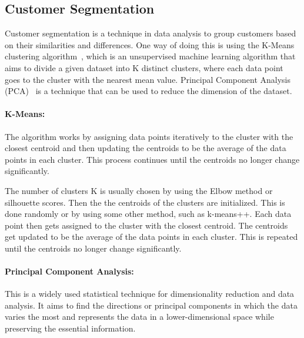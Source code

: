 \documentclass[a4paper,fleqn]{cas-sc}
\begin{document}
\subsection{Customer Segmentation}

Customer segmentation is a technique in data analysis to group customers based on their similarities and differences. One way of doing this is using the K-Means clustering algorithm~\cite{kmeans}, which is an unsupervised machine learning algorithm that aims to divide a given dataset into K distinct clusters, where each data point goes to the cluster with the nearest mean value. Principal Component Analysis (PCA)~\cite{Jolliffe2011} is a technique that can be used to reduce the dimension of the dataset.


\paragraph{K-Means:}
The algorithm works by assigning data points iteratively to the cluster with the closest centroid and then updating the centroids to be the average of the data points in each cluster. This process continues until the centroids no longer change significantly.

The number of clusters K is usually chosen by using the Elbow method or silhouette scores. Then the the centroids of the clusters are initialized. This is done randomly or by using some other method, such as k-means++. Each data point then gets assigned to the cluster with the closest centroid. The centroids get updated to be the average of the data points in each cluster. This is repeated until the centroids no longer change significantly. 

\paragraph{Principal Component Analysis:}
This is a widely used statistical technique for dimensionality reduction and data analysis. It aims to find the directions or principal components in which the data varies the most and represents the data in a lower-dimensional space while preserving the essential information.
\end{document}
